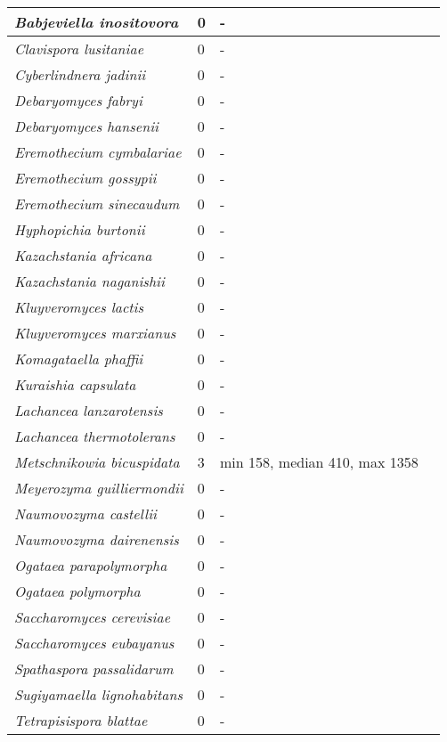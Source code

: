 {\begin{longtable}{| L{4cm} | L{2cm}  | L{5cm} | L{4cm} |}
\textit{Babjeviella inositovora} & 0 & - & \\ \hline
\textit{Clavispora lusitaniae} & 0 & - & \\ \hline
\textit{Cyberlindnera jadinii} & 0 & - & \\ \hline
\textit{Debaryomyces fabryi} & 0 & - & \\ \hline
\textit{Debaryomyces hansenii} & 0 & - & \\ \hline
\textit{Eremothecium cymbalariae} & 0 & - & \\ \hline
\textit{Eremothecium gossypii} & 0 & - & \\ \hline
\textit{Eremothecium sinecaudum} & 0 & - & \\ \hline
\textit{Hyphopichia burtonii} & 0 & - & \\ \hline
\textit{Kazachstania africana} & 0 & - & \\ \hline
\textit{Kazachstania naganishii} & 0 & - & \\ \hline
\textit{Kluyveromyces lactis} & 0 & - & \\ \hline
\textit{Kluyveromyces marxianus} & 0 & - & \\ \hline
\textit{Komagataella phaffii} & 0 & - & \\ \hline
\textit{Kuraishia capsulata} & 0 & - & \\ \hline
\textit{Lachancea lanzarotensis} & 0 & - & \\ \hline
\textit{Lachancea thermotolerans} & 0 & - & \\ \hline
\textit{Metschnikowia bicuspidata} & 3 & min 158, median 410, max 1358 & \\ \hline
\textit{Meyerozyma guilliermondii} & 0 & - & \\ \hline
\textit{Naumovozyma castellii} & 0 & - & \\ \hline
\textit{Naumovozyma dairenensis} & 0 & - & \\ \hline
\textit{Ogataea parapolymorpha} & 0 & - & \\ \hline
\textit{Ogataea polymorpha} & 0 & - & \\ \hline
\textit{Saccharomyces cerevisiae} & 0 & - & \\ \hline
\textit{Saccharomyces eubayanus} & 0 & - & \\ \hline
\textit{Spathaspora passalidarum} & 0 & - & \\ \hline
\textit{Sugiyamaella lignohabitans} & 0 & - & \\ \hline
\textit{Tetrapisispora blattae} & 0 & - & \\ \hline

\end{longtable}}
